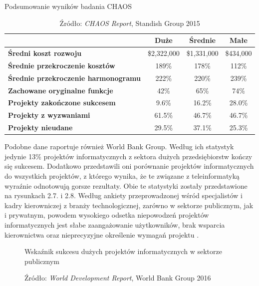 \begin{table}[ht]
\centering
\caption{Podsumowanie wyników badania CHAOS}
\label{tab:chaos_summary}
\begin{tabular}{lccc}
\toprule
& \textbf{Duże} & \textbf{Średnie} & \textbf{Małe} \\
\midrule
\textbf{Średni koszt rozwoju} & \$2{,}322{,}000 & \$1{,}331{,}000 & \$434{,}000 \\
\textbf{Średnie przekroczenie kosztów} & 189\% & 178\% & 112\% \\
\textbf{Średnie przekroczenie harmonogramu} & 222\% & 220\% & 239\% \\
\textbf{Zachowane oryginalne funkcje} & 42\% & 65\% & 74\% \\
\textbf{Projekty zakończone sukcesem} & 9.6\% & 16.2\% & 28.0\% \\
\textbf{Projekty z wyzwaniami} & 61.5\% & 46.7\% & 46.7\% \\
\textbf{Projekty nieudane} & 29.5\% & 37.1\% & 25.3\% \\
\bottomrule
\end{tabular}
\caption*{Źródło: \textit{CHAOS Report}, Standish Group 2015}

\end{table}

Podobne dane raportuje również World Bank Group. Według ich statystyk jedynie 13\% projektów informatycznych z sektora dużych przedsiębiorstw kończy się sukcesem. Dodatkowo przedstawili oni porównanie projektów informatycznych do wszystkich projektów, z którego wynika, że te związane z teleinformatyką wyraźnie odnotowują gorsze rezultaty. Obie te statystyki zostały przedstawione na rysunkach 2.7. i 2.8. Według ankiety przeprowadzonej wśród specjalistów i kadry kierowniczej z branży technologicznej, zarówno w sektorze publicznym, jak i prywatnym, powodem wysokiego odsetka niepowodzeń projektów informatycznych jest słabe zaangażowanie użytkowników, brak wsparcia kierownictwa oraz nieprecyzyjne określenie wymagań projektu \autocite{wdr}.

\begin{figure}[htbp]
\centering
\caption{Wskaźnik sukcesu dużych projektów informatycznych w sektorze publicznym}

\label{fig:B3.5.1}

\caption*{Źródło: \textit{World Development Report}, World Bank Group 2016}
\end{figure}


